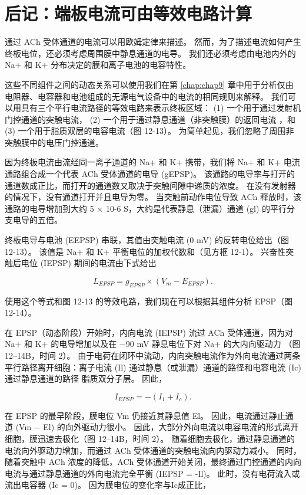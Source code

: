 \section{后记：端板电流可由等效电路计算}

通过 ACh 受体通道的电流可以用欧姆定律来描述。 
然而，为了描述电流如何产生终板电位，还必须考虑周围膜中静息通道的电导。 
我们还必须考虑由电池内外的 Na+ 和 K+ 分布决定的膜和离子电池的电容特性。


这些不同组件之间的动态关系可以使用我们在第 \ref{chap:chap9} 章中用于分析仅由电阻器、电容器和电池组成的无源电气设备中的电流的相同规则来解释。
我们可以用具有三个平行电流路径的等效电路来表示终板区域：
(1) 一个用于通过发射机门控通道的突触电流，
(2) 一个用于通过静息通道（非突触膜）的返回电流 ，和 
(3) 一个用于脂质双层的电容电流（图 12-13）。 
为简单起见，我们忽略了周围非突触膜中的电压门控通道。


因为终板电流由流经同一离子通道的 Na+ 和 K+ 携带，我们将 Na+ 和 K+ 电流通路组合成一个代表 ACh 受体通道的电导 (gEPSP)。 
该通路的电导率与打开的通道数成正比，而打开的通道数又取决于突触间隙中递质的浓度。 
在没有发射器的情况下，没有通道打开并且电导为零。 
当突触前动作电位导致 ACh 释放时，该通路的电导增加到大约 5 × 10-6 S，大约是代表静息（泄漏）通道 (gl) 的平行分支电导的五倍。


终板电导与电池 (EEPSP) 串联，其值由突触电流 (0 mV) 的反转电位给出（图 12-13）。 
该值是 Na+ 和 K+ 平衡电位的加权代数和（见方框 12-1）。 
兴奋性突触后电位 (IEPSP) 期间的电流由下式给出


\begin{equation}\label{excitatory_potential}
	L_{EPSP} = g_{EPSP} \times (V_m - E_{EPSP}).
\end{equation}

使用这个等式和图 12-13 的等效电路，我们现在可以根据其组件分析 EPSP（图 12-14）。


在 EPSP（动态阶段）开始时，内向电流 (IEPSP) 流过 ACh 受体通道，因为对 Na+ 和 K+ 的电导增加以及在 −90 mV 静息电位下对 Na+ 的大内向驱动力 （图 12–14B，时间 2）。 
由于电荷在闭环中流动，内向突触电流作为外向电流通过两条平行路径离开细胞：离子电流 (Il) 通过静息（或泄漏）通道的路径和电容电流 (Ic) 通过静息通道的路径 脂质双分子层。 因此，


\begin{equation}\label{ionic_current}
	I_{EPSP} = -(I_1 + I_c).
\end{equation}

在 EPSP 的最早阶段，膜电位 Vm 仍接近其静息值 El。
因此，电流通过静止通道 (Vm − El) 的向外驱动力很小。 
因此，大部分外向电流以电容电流的形式离开细胞，膜迅速去极化（图 12–14B，时间 2）。 
随着细胞去极化，通过静息通道的电流向外驱动力增加，而通过 ACh 受体通道的突触电流向内驱动力减小。 
同时，随着突触中 ACh 浓度的降低，ACh 受体通道开始关闭，最终通过门控通道的内向电流与通过静息通道的外向电流完全平衡 (IEPSP = -Il)。 
此时，没有电荷流入或流出电容器 (Ic = 0)。 
因为膜电位的变化率与Ic成正比，


